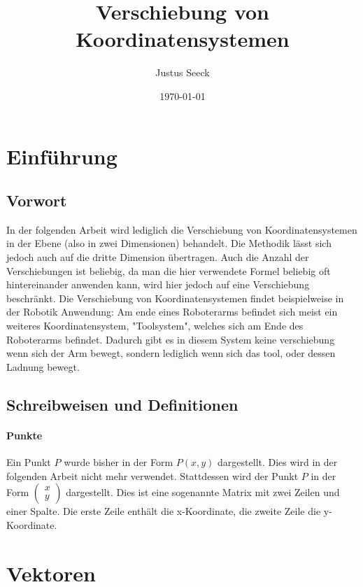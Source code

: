 \documentclass{article}
\title{Verschiebung von Koordinatensystemen}
\author{Justus Seeck}
\date{\today}
\newcommand{\m}[1]{\begin{pmatrix}#1\end{pmatrix}}
\begin{document}
    \maketitle

    \tableofcontents

    \newpage

    \section{Einführung}

    \subsection{Vorwort}

    In der folgenden Arbeit wird lediglich die Verschiebung von Koordinatensystemen in der Ebene (also in zwei Dimensionen) behandelt.
    Die Methodik lässt sich jedoch auch auf die dritte Dimension übertragen. Auch die Anzahl der Verschiebungen ist beliebig, da man die
    hier verwendete Formel beliebig oft hintereinander anwenden kann, wird hier jedoch auf eine Verschiebung beschränkt.
    Die Verschiebung von Koordinatensystemen findet beispielweise in der Robotik Anwendung: Am ende eines Roboterarms befindet sich meist ein weiteres Koordinatensystem, "Toolsystem", welches sich am Ende des Roboterarms befindet. Dadurch gibt es in diesem System keine verschiebung wenn sich der Arm bewegt, sondern lediglich wenn sich das tool, oder dessen Ladnung bewegt.

    \subsection{Schreibweisen und Definitionen}
    
    \paragraph*{Punkte}

    Ein Punkt $P$ wurde bisher in der Form $P(x,y)$ dargestellt. Dies wird in der folgenden Arbeit nicht mehr verwendet. Stattdessen wird
    der Punkt $P$ in der Form $\m{x \\ y}$ dargestellt. Dies ist eine sogenannte Matrix mit zwei Zeilen und einer Spalte.
    Die erste Zeile enthält die x-Koordinate, die zweite Zeile die y-Koordinate.

    
    \section{Vektoren}
\end{document}
